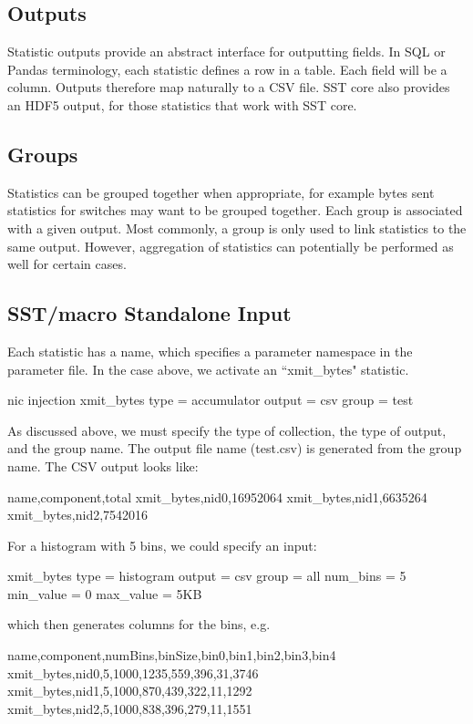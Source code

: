 \subsection{Outputs}
Statistic outputs provide an abstract interface for outputting fields.
In SQL or Pandas terminology, each statistic defines a row in a table. Each field will be a column.
Outputs therefore map naturally to a CSV file.
SST core also provides an HDF5 output, for those statistics that work with SST core.

\subsection{Groups}
Statistics can be grouped together when appropriate, for example bytes sent statistics for switches may want to be grouped together.
Each group is associated with a given output.
Most commonly, a group is only used to link statistics to the same output.
However, aggregation of statistics can potentially be performed as well for certain cases.

\subsection{SST/macro Standalone Input}
Each statistic has a name, which specifies a parameter namespace in the parameter file.
In the case above, we activate an ``xmit\_bytes" statistic.

\begin{ViFile}
nic {
  injection {
   xmit_bytes {
     type = accumulator
     output = csv
     group = test
   }
  }
}
\end{ViFile}
As discussed above, we must specify the type of collection, the type of output, and the group name.
The output file name (test.csv) is generated from the group name. The CSV output looks like:

\begin{ViFile}
name,component,total
xmit_bytes,nid0,16952064
xmit_bytes,nid1,6635264
xmit_bytes,nid2,7542016
\end{ViFile}
For a histogram with 5 bins, we could specify an input:

\begin{ViFile}
 xmit_bytes {
  type = histogram
  output = csv
  group = all
  num_bins = 5
  min_value = 0
  max_value = 5KB
}
\end{ViFile}
which then generates columns for the bins, e.g.

\begin{ViFile}
name,component,numBins,binSize,bin0,bin1,bin2,bin3,bin4
xmit_bytes,nid0,5,1000,1235,559,396,31,3746
xmit_bytes,nid1,5,1000,870,439,322,11,1292
xmit_bytes,nid2,5,1000,838,396,279,11,1551
\end{ViFile}

